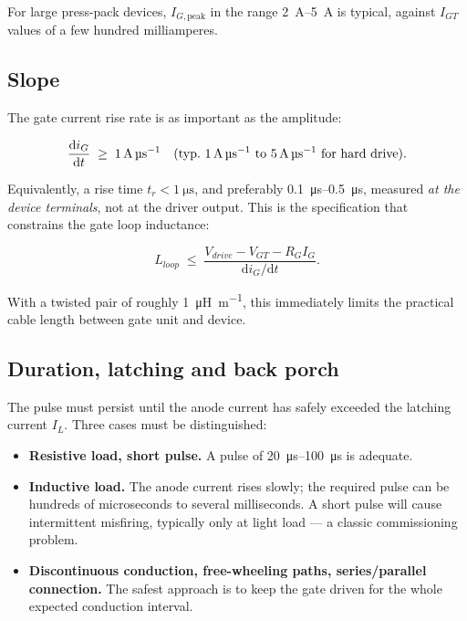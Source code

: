 \documentclass[11pt,a4paper]{article}
\begin{document}
For large press-pack devices, $I_{G,\text{peak}}$ in the range
\SIrange{2}{5}{\ampere} is typical, against $I_{GT}$ values of a few hundred
milliamperes.

\subsection{Slope}

The gate current rise rate is as important as the amplitude:

\begin{equation}
  \frac{\mathrm{d}i_G}{\mathrm{d}t} \;\ge\; \SI{1}{\ampere\per\micro\second}
  \quad \text{(typ.\ \SIrange{1}{5}{\ampere\per\micro\second} for hard drive).}
  \label{eq:didt}
\end{equation}

Equivalently, a rise time $t_r < \SI{1}{\micro\second}$, and preferably
\SIrange{0.1}{0.5}{\micro\second}, measured \emph{at the device terminals}, not at
the driver output. This is the specification that constrains the gate loop
inductance:

\begin{equation}
  L_{loop} \;\le\; \frac{V_{drive} - V_{GT} - R_G I_G}{\mathrm{d}i_G/\mathrm{d}t}.
  \label{eq:lloop}
\end{equation}

With a twisted pair of roughly \SI{1}{\micro\henry\per\metre}, this immediately
limits the practical cable length between gate unit and device.

\subsection{Duration, latching and back porch}

The pulse must persist until the anode current has safely exceeded the latching
current $I_L$. Three cases must be distinguished:

\begin{itemize}
  \item \textbf{Resistive load, short pulse.} A pulse of
        \SIrange{20}{100}{\micro\second} is adequate.
  \item \textbf{Inductive load.} The anode current rises slowly; the required pulse
        can be hundreds of microseconds to several milliseconds. A short pulse will
        cause intermittent misfiring, typically only at light load --- a classic
        commissioning problem.
  \item \textbf{Discontinuous conduction, free-wheeling paths, series/parallel
        connection.} The safest approach is to keep the gate driven for the whole
        expected conduction interval.
\end{itemize}
\end{document}

